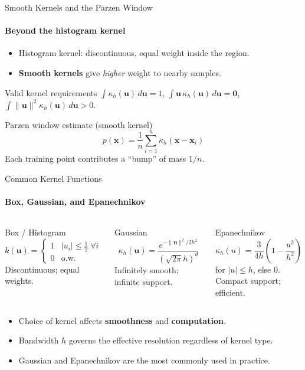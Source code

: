 \begin{frame}{Smooth Kernels and the Parzen Window}
  \framesubtitle{Beyond the histogram kernel}
  \begin{itemize}
    \item Histogram kernel: discontinuous, equal weight inside the region.
    \item \textbf{Smooth kernels} give \emph{higher} weight to nearby samples.
  \end{itemize}
  \medskip
  \begin{block}{Valid kernel requirements}
    $\displaystyle\int \kappa_h(\mathbf{u})\,d\mathbf{u} = 1$,\quad
    $\displaystyle\int \mathbf{u}\,\kappa_h(\mathbf{u})\,d\mathbf{u} = \mathbf{0}$,\quad
    $\displaystyle\int \|\mathbf{u}\|^2\kappa_h(\mathbf{u})\,d\mathbf{u} > 0$.
  \end{block}
  \medskip
  \begin{block}{Parzen window estimate (smooth kernel)}
    \[
      p(\mathbf{x}) = \frac{1}{n}\sum_{i=1}^{n}\kappa_h(\mathbf{x}-\mathbf{x}_i)
    \]
    Each training point contributes a ``bump'' of mass $1/n$.
  \end{block}
\end{frame}

\begin{frame}{Common Kernel Functions}
  \framesubtitle{Box, Gaussian, and Epanechnikov}
  \begin{columns}[T,onlytextwidth]
      \begin{block}{Box / Histogram}
        \[k(\mathbf{u}) = \begin{cases}1 & |u_i|\le\tfrac{1}{2}\;\forall i\\0 & \text{o.w.}\end{cases}\]
        Discontinuous; equal weights.
      \end{block}
      \begin{block}{Gaussian}
        \[\kappa_h(\mathbf{u})=\frac{e^{-\|\mathbf{u}\|^2/2h^2}}{(\sqrt{2\pi}h)^d}\]
        Infinitely smooth; infinite support.
      \end{block}
      \begin{block}{Epanechnikov}
        \[\kappa_h(u)=\frac{3}{4h}\!\left(1-\frac{u^2}{h^2}\right)\]
        for $|u|\le h$, else $0$.\\
        Compact support; efficient.
      \end{block}
  \end{columns}
  \bigskip
  \begin{itemize}
    \item Choice of kernel affects \textbf{smoothness} and \textbf{computation}.
    \item Bandwidth $h$ governs the effective resolution regardless of kernel type.
    \item Gaussian and Epanechnikov are the most commonly used in practice.
  \end{itemize}
\end{frame}

